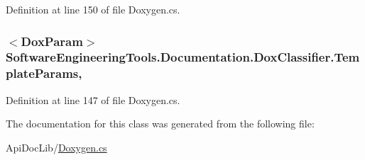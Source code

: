 Definition at line 150 of file Doxygen.\+cs.

\hypertarget{class_software_engineering_tools_1_1_documentation_1_1_dox_classifier_ad84f20e5051e75adedb2899702c94aaa}{
\subsubsection[{Template\+Params}]{$<${\bf Dox\+Param}$>$ Software\+Engineering\+Tools.\+Documentation.\+Dox\+Classifier.\+Template\+Params\hspace{0.3cm}{\ttfamily [get]}, {\ttfamily [set]}}}\label{class_software_engineering_tools_1_1_documentation_1_1_dox_classifier_ad84f20e5051e75adedb2899702c94aaa}


Definition at line 147 of file Doxygen.\+cs.



The documentation for this class was generated from the following file\+:\begin{DoxyCompactItemize}
\item 
Api\+Doc\+Lib/\hyperlink{_doxygen_8cs}{Doxygen.\+cs}\end{DoxyCompactItemize}
